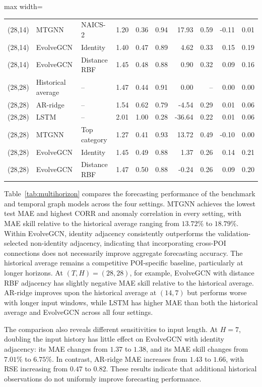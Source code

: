\documentclass[preprint,authoryear,11pt]{elsarticle}
\theoremstyle{definition}
\begin{document}
\begin{table}[!htbp]
\begin{adjustbox}{max width=\linewidth}
\begin{tabular}{lllrrrrrrr}
(28,14) & MTGNN & NAICS-2 & 1.20 & 0.36 & 0.94 & 17.93 & 0.59 & -0.11 & 0.01 \\
(28,14) & EvolveGCN & Identity & 1.40 & 0.47 & 0.89 & 4.62 & 0.33 & 0.15 & 0.19 \\
(28,14) & EvolveGCN & Distance RBF & 1.45 & 0.48 & 0.88 & 0.90 & 0.32 & 0.09 & 0.16 \\
\midrule
(28,28) & Historical average & -- & 1.47 & 0.44 & 0.91 & 0.00 & -- & 0.00 & 0.00 \\
(28,28) & AR-ridge & -- & 1.54 & 0.62 & 0.79 & -4.54 & 0.29 & 0.01 & 0.06 \\
(28,28) & LSTM & -- & 2.01 & 1.00 & 0.28 & -36.64 & 0.22 & 0.01 & 0.06 \\
(28,28) & MTGNN & Top category & 1.27 & 0.41 & 0.93 & 13.72 & 0.49 & -0.10 & 0.00 \\
(28,28) & EvolveGCN & Identity & 1.45 & 0.49 & 0.88 & 1.37 & 0.26 & 0.14 & 0.21 \\
(28,28) & EvolveGCN & Distance RBF & 1.47 & 0.50 & 0.88 & -0.24 & 0.26 & 0.09 & 0.20 \\
\bottomrule
\end{tabular}
\end{adjustbox}
\endgroup
\end{table}


Table~\ref{tab:multihorizon} compares the forecasting performance of the benchmark and temporal graph models across the four settings.
MTGNN achieves the lowest test MAE and highest CORR and anomaly correlation in every setting, with MAE skill relative to the historical average ranging from \(13.72\%\) to \(18.79\%\).
Within EvolveGCN, identity adjacency consistently outperforms the validation-selected non-identity adjacency, indicating that incorporating cross-POI connections does not necessarily improve aggregate forecasting accuracy.
The historical average remains a competitive POI-specific baseline, particularly at longer horizons.
At \((T,H)=(28,28)\), for example, EvolveGCN with distance RBF adjacency has slightly negative MAE skill relative to the historical average.
AR-ridge improves upon the historical average at \((14,7)\) but performs worse with longer input windows, while LSTM has higher MAE than both the historical average and EvolveGCN across all four settings.

The comparison also reveals different sensitivities to input length.
At \(H=7\), doubling the input history has little effect on EvolveGCN with identity adjacency: its MAE changes from \(1.37\) to \(1.38\), and its MAE skill changes from \(7.01\%\) to \(6.75\%\).
In contrast, AR-ridge MAE increases from \(1.43\) to \(1.66\), with RSE increasing from \(0.47\) to \(0.82\).
These results indicate that additional historical observations do not uniformly improve forecasting performance.
\end{document}

